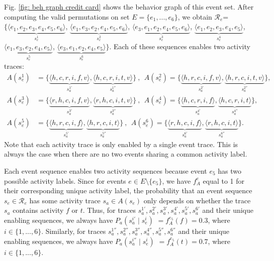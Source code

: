 Fig. \ref{fig: beh graph credit card} shows the behavior graph of this event set.
After computing the valid permutations on set $E=\{e_1,...,e_6\}$, we obtain 
$\mathcal{R}_e$=$\{
\underbrace{\langle e_1,e_2,e_3,e_4,e_5,e_6\rangle}_{s_e^1}$, 
$\underbrace{\langle e_1,e_3,e_2,e_4,e_5,e_6\rangle}_{s_e^2}$,
$\underbrace{\langle e_3,e_1,e_2,e_4,e_5,e_6\rangle}_{s_e^3}$,
$\underbrace{\langle e_1,e_2,e_3,e_4,e_5\rangle}_{s_e^4}$,
$\underbrace{\langle e_1,e_3,e_2,e_4,e_5\rangle}_{s_e^5}$,
$\underbrace{\langle e_3,e_1,e_2,e_4,e_5\rangle}_{s_e^6}
\}$.
Each of these sequences enables two activity traces:
\begin{align*}
A(s_e^1)&= \{ \underbrace{\langle h,c,r,i,f,v \rangle}_{s_a^{1'}}, \underbrace{\langle h,c,r,i,t,v \rangle}_{s_a^{1''}}\} ~,~~
A(s_e^2)= \{ \underbrace{\langle h,r,c,i,f,v \rangle}_{s_a^{2'}}, \underbrace{\langle h,r,c,i,t,v \rangle}_{s_a^{2''}}\}, \\
A(s_e^3)&= \{ \underbrace{\langle r,h,c,i,f,v \rangle}_{s_a^{3'}}, \underbrace{\langle r,h,c,i,t,v \rangle}_{s_a^{3''}}\} ~,~~
A(s_e^4)= \{ \underbrace{\langle h,c,r,i,f \rangle}_{s_a^{4'}}, \underbrace{\langle h,c,r,i,t \rangle}_{s_a^{4''}}\}, \\
A(s_e^5)&= \{ \underbrace{\langle h,r,c,i,f \rangle}_{s_a^{5'}}, \underbrace{\langle h,r,c,i,t \rangle}_{s_a^{5''}}\} ~,~~
A(s_e^6)= \{ \underbrace{\langle r,h,c,i,f \rangle}_{s_a^{6'}}, \underbrace{\langle r,h,c,i,t \rangle}_{s_a^{6''}}\}.
\end{align*}
Note that each activity trace is only enabled by a single event trace.
This is always the case when there are no two events sharing a common activity label.

Each event sequence enables two activity sequences because event $e_5$ has two possible activity labels.
Since for events $e \in E \setminus \{e_5\}$, we have $f_A^e$ equal to 1 for their corresponding unique activity label, the probability that an event sequence $s_e \in \mathcal{R}_e$ has some activity trace $s_a \in A(s_e)$ only depends on whether the trace $s_a$ contains activity $f$ or $t$.
Thus, for traces $s_a^{1'},s_a^{2'},s_a^{3'},s_a^{4'},s_a^{5'},s_a^{6'}$ and their unique enabling sequences, we always have \mbox{$P_a(s_a^{i'} \mid s_e^{i})$} $= f_A^{e_5}(f) = 0.3$, where $i \in \{1,...,6\}$.
Similarly, for traces $s_a^{1''},s_a^{2''},s_a^{3''},s_a^{4''},s_a^{5''},s_a^{6''}$ and their unique enabling sequences, we always have \mbox{$P_a(s_a^{i''} \mid s_e^{i})$} $= f_A^{e_5}(t) = 0.7$, where \mbox{$i \in \{1,...,6\}$}.

